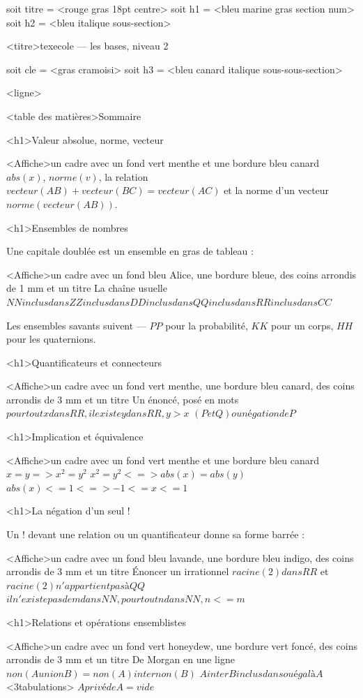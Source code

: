\documentclass[marges=2, taille=11]{texecole}
\begin{document}
soit titre = <rouge gras 18pt centre>
soit h1 = <bleu marine gras section num>
soit h2 = <bleu italique sous-section>

<titre>texecole — les bases, niveau 2

soit cle = <gras cramoisi>
soit h3 = <bleu canard italique sous-sous-section>

<ligne>

<table des matières>{Sommaire}

<h1>Valeur absolue, norme, vecteur

<Affiche>un cadre avec un fond vert menthe et une bordure bleu canard {
	$abs(x)$, $norme(v)$, la relation $vecteur(AB) + vecteur(BC) = vecteur(AC)$
	et la norme d'un vecteur $norme(vecteur(AB))$.
}

<h1>Ensembles de nombres

Une capitale doublée est un ensemble en gras de tableau :

<Affiche>un cadre avec un fond bleu Alice,  une bordure bleue, des coins arrondis de 1 mm et un titre {La chaîne usuelle} {
	$NN inclus dans ZZ inclus dans DD inclus dans QQ inclus dans RR inclus dans CC$
}

Les ensembles savants suivent — $PP$ pour la probabilité, $KK$ pour un corps, $HH$ pour les quaternions.

<h1>Quantificateurs et connecteurs

<Affiche>un cadre avec un fond vert menthe, une bordure bleu canard, des coins arrondis de 3 mm et un titre {Un énoncé, posé en mots} {
	$pour tout x dans RR, il existe y dans RR, y > x$
	$(P et Q) ou négation de P$
}

<h1>Implication et équivalence

<Affiche>un cadre avec un fond vert menthe et une bordure bleu canard {
	$x = y => x^2 = y^2$
	$x^2 = y^2 <=> abs(x) = abs(y)$
	$abs(x) <= 1 <=> -1 <= x <= 1$
}

<h1>La négation d'un seul !

Un ! devant une relation ou un quantificateur donne sa forme barrée :

<Affiche>un cadre avec un fond bleu lavande, une bordure bleu indigo, des coins arrondis de 3 mm et un titre {Énoncer un irrationnel} {
	$racine(2) dans RR$ et $racine(2) n'appartient pas à QQ$
	$il n'existe pas de m dans NN, pour tout n dans NN, n <= m$
}

<h1>Relations et opérations ensemblistes

<Affiche>un cadre avec un fond vert honeydew, une bordure vert foncé, des coins arrondis de 3 mm et un titre {De Morgan en une ligne} {
	$non(A union B) = non(A) inter non(B)$
	$A inter B inclus dans ou égal à A$ <3tabulations> $A privé de A = vide$
}
\end{document}
